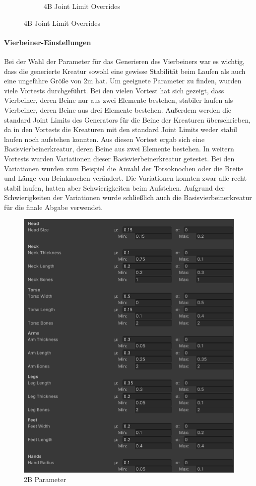 \begin{figure}
\begin{subfigure}[b]{0.45\textwidth}
        \caption{4B Joint Limit Overrides}\label{fig:4B_joint_limit_overrides}
    \end{subfigure}
\end{figure}

\paragraph{Vierbeiner-Einstellungen}
Bei der Wahl der Parameter für das Generieren des Vierbeiners war es wichtig, dass die generierte Kreatur sowohl eine gewisse Stabilität beim Laufen als auch eine ungefähre Größe von 2m hat. Um geeignete Parameter zu finden, wurden viele Vortests durchgeführt. Bei den vielen Vortest hat sich gezeigt, dass Vierbeiner, deren Beine nur aus zwei Elemente bestehen, stabiler laufen als Vierbeiner, deren Beine aus drei Elemente bestehen. Außerdem werden die standard Joint Limits des Generators für die Beine der Kreaturen überschrieben, da in den Vortests die Kreaturen mit den standard Joint Limits weder stabil laufen noch aufstehen konnten. Aus diesen Vortest ergab sich eine Basisvierbeinerkreatur, deren Beine aus zwei Elemente bestehen. In weitern Vortests wurden Variationen dieser Basisvierbeinerkreatur getestet. Bei den Variationen wurden zum Beispiel die Anzahl der Torsoknochen oder die Breite und Länge von Beinknochen verändert. Die Variationen konnten zwar alle recht stabil laufen, hatten aber Schwierigkeiten beim Aufstehen. Aufgrund der Schwierigkeiten der Variationen wurde schließlich auch die Basisvierbeinerkreatur für die finale Abgabe verwendet. 

\begin{figure}[ht]
    \centering
    \includegraphics[width=0.5\linewidth]{resources/img/2bSettings}
    \caption{2B Parameter}
    \label{fig:2B_creature_settings}
\end{figure}

